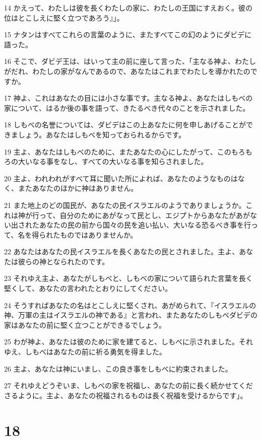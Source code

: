 \par 14 かえって、わたしは彼を長くわたしの家に、わたしの王国にすえおく。彼の位はとこしえに堅く立つであろう』」。
\par 15 ナタンはすべてこれらの言葉のように、またすべてこの幻のようにダビデに語った。
\par 16 そこで、ダビデ王は、はいって主の前に座して言った、「主なる神よ、わたしがだれ、わたしの家がなんであるので、あなたはこれまでわたしを導かれたのですか。
\par 17 神よ、これはあなたの目には小さな事です。主なる神よ、あなたはしもべの家について、はるか後の事を語って、きたるべき代々のことを示されました。
\par 18 しもべの名誉については、ダビデはこの上あなたに何を申しあげることができましょう。あなたはしもべを知っておられるからです。
\par 19 主よ、あなたはしもべのために、またあなたの心にしたがって、このもろもろの大いなる事をなし、すべての大いなる事を知らされました。
\par 20 主よ、われわれがすべて耳に聞いた所によれば、あなたのようなものはなく、またあなたのほかに神はありません。
\par 21 また地上のどの国民が、あなたの民イスラエルのようでありましょうか。これは神が行って、自分のためにあがなって民とし、エジプトからあなたがあがない出されたあなたの民の前から国々の民を追い払い、大いなる恐るべき事を行って、名を得られたものではありませんか。
\par 22 あなたはあなたの民イスラエルを長くあなたの民とされました。主よ、あなたは彼らの神となられたのです。
\par 23 それゆえ主よ、あなたがしもべと、しもべの家について語られた言葉を長く堅くして、あなたの言われたとおりにしてください。
\par 24 そうすればあなたの名はとこしえに堅くされ、あがめられて、『イスラエルの神、万軍の主はイスラエルの神である』と言われ、またあなたのしもべダビデの家はあなたの前に堅く立つことができるでしょう。
\par 25 わが神よ、あなたは彼のために家を建てると、しもべに示されました。それゆえ、しもべはあなたの前に祈る勇気を得ました。
\par 26 主よ、あなたは神にいまし、この良き事をしもべに約束されました。
\par 27 それゆえどうぞいま、しもべの家を祝福し、あなたの前に長く続かせてくださるように。主よ、あなたの祝福されるものは長く祝福を受けるからです」。

\chapter{18}

